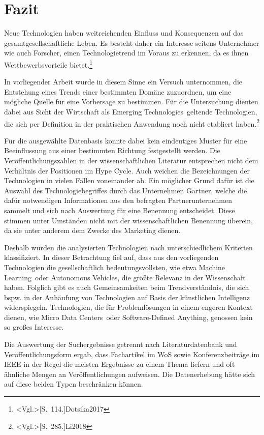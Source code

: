 \section{Fazit}
Neue Technologien haben weitreichenden Einfluss und Konsequenzen auf das ge\-samt\-ge\-sellschaftliche Leben. Es besteht daher ein Interesse seitens Unternehmer wie auch Forscher, einen Technologietrend im Voraus zu erkennen, da es ihnen Wettbewerbsvorteile bietet.\footnote{\citeNP<Vgl.>[S.~114.]{Dotsika2017}}

In vorliegender Arbeit wurde in diesem Sinne ein Versuch unternommen, die Entstehung eines Trends einer bestimmten Domäne zuzuordnen, um eine mögliche Quelle für eine Vorhersage zu bestimmen. Für die Untersuchung dienten dabei aus Sicht der Wirtschaft als \glqq Emerging Technologies\grqq~geltende Technologien, die sich per Definition in der praktischen Anwendung noch nicht etabliert haben.\footnote{\citeNP<Vgl.>[S.~285.]{Li2018}}

Für die ausgewählte Datenbasis konnte dabei kein eindeutiges Muster für eine Beeinflussung aus einer bestimmten Richtung festgestellt werden. Die Ver\-öf\-fent\-li\-chungs\-zah\-len in der wissenschaftlichen Literatur entsprechen nicht dem Verhältnis der Positionen im \glqq Hype Cycle\grqq. Auch weichen die Bezeichnungen der Technologien in vielen Fällen voneinander ab. Ein möglicher Grund dafür ist die Auswahl des Technologiebegriffes durch das Unternehmen \glqq Gartner\grqq, welche die dafür notwendigen Informationen aus den befragten Partnerunternehmen sammelt und sich nach Auswertung für eine Benennung entscheidet. Diese stimmen unter Umständen nicht mit der wissenschaftlichen Benennung überein, da sie unter anderem dem Zwecke des Marketing dienen.

Deshalb wurden die analysierten Technologien nach unterschiedlichem Kriterien klassifiziert. In dieser Betrachtung fiel auf, dass aus den vorliegenden Technologien die gesellschaftlich bedeutungsvollsten, wie etwa \glqq Machine Learning\grqq~oder \glqq Autonomous Vehicles\grqq, die größte Relevanz in der Wissenschaft haben. Folglich gibt es auch Gemeinsamkeiten beim Trendverständnis, die sich bspw. in der Anhäufung von Technologien auf Basis der künstlichen Intelligenz widerspiegeln. Technologien, die für Problemlösungen in einem engeren Kontext dienen, wie \glqq Micro Data Centers\grqq~oder \glqq Software-Defined Anything\grqq, genossen kein so großes Interesse. 

Die Auswertung der Suchergebnisse getrennt nach Literaturdatenbank und Ver\-öf\-fent\-li\-chungs\-form ergab, dass Fachartikel im \ac{WoS} sowie Konferenzbeiträge im \ac{IEEE} in der Regel die meisten Ergebnisse zu einem Thema liefern und oft ähnliche Mengen an Veröffentlichungen aufweisen. Die Datenerhebung hätte sich auf diese beiden Typen beschränken können.

